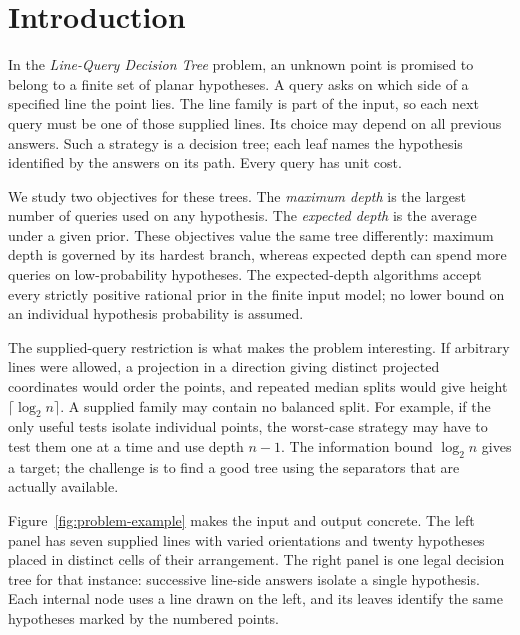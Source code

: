 \section{Introduction}

In the \emph{Line-Query Decision Tree} problem, an unknown point is
promised to belong to a finite set of planar hypotheses. A query asks
on which side of a specified line the point lies. The line family is
part of the input, so each next query must be one of those supplied
lines. Its choice may depend on all previous answers. Such a strategy
is a decision tree; each leaf names the hypothesis identified by the
answers on its path.
Every query has unit cost.

We study two objectives for these trees. The \emph{maximum depth} is
the largest number of queries used on any hypothesis. The
\emph{expected depth} is the average under a given prior. These
objectives value the same tree differently: maximum depth is governed
by its hardest branch, whereas expected depth can spend more queries
on low-probability hypotheses. The expected-depth algorithms accept
every strictly positive rational prior in the finite input model; no
lower bound on an individual hypothesis probability is assumed.

The supplied-query restriction is what makes the problem
interesting. If arbitrary lines were allowed, a projection in a
direction giving distinct projected coordinates would order the
points, and repeated median splits
would give height $\lceil\log_2 n\rceil$. A supplied family may
contain no balanced split. For example, if the only useful tests
isolate individual points, the worst-case strategy may have to test
them one at a time and use depth $n-1$. The information bound
$\log_2 n$ gives a target; the challenge is to find a good tree using
the separators that are actually available.

Figure~\ref{fig:problem-example} makes the input and output concrete.
The left panel has seven supplied lines with varied orientations and
twenty hypotheses placed in distinct cells of their arrangement.
The right panel is one legal decision tree for that instance:
successive line-side answers isolate a single hypothesis. Each internal
node uses a line drawn on the left, and its leaves identify the same
hypotheses marked by the numbered points.

